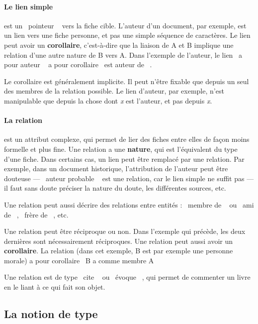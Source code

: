 \documentclass[11pt,french]{article}
\makeatletter
\providecommand{\og}{\leavevmode\flqq~}%
\providecommand{\fg}{\ifdim\lastskip>\z@\unskip\fi~\frqq}%
\makeatother
\begin{document}
\paragraph{Le lien simple }

est un \og pointeur \fg{} vers la fiche cible. L'auteur d'un document,
par exemple, est un lien vers une fiche personne, et pas une simple
séquence de caractères. Le lien peut avoir un \textbf{corollaire},
c'est-à-dire que la liaison de A et B implique une relation d'une
autre nature de B vers A. Dans l'exemple de l'auteur, le lien \og a
pour auteur \fg{} a pour corollaire \og est auteur de \fg{}. 

Le corollaire est généralement implicite. Il peut n'être fixable que
depuis un seul des membres de la relation possible. Le lien d'auteur,
par exemple, n'est manipulable que depuis la chose dont \emph{x} est
l'auteur, et pas depuis \emph{x}. 


\paragraph{La relation}

est un attribut complexe, qui permet de lier des fiches entre elles
de façon moins formelle et plus fine. Une relation a une \textbf{nature},
qui est l'équivalent du type d'une fiche. Dans certains cas, un lien
peut être remplacé par une relation. Par exemple, dans un document
historique, l'attribution de l'auteur peut être douteuse — \og auteur
probable \fg{} est une relation, car le lien simple ne suffit pas
— il faut sans doute préciser la nature du doute, les différentes
sources, etc.

Une relation peut aussi décrire des relations entre entités : \og membre
de \fg{} ou \og ami de \fg{}, \og frère de \fg{}, etc.

Une relation peut être réciproque ou non. Dans l'exemple qui précède,
les deux dernières sont nécessairement réciproques. Une relation peut
aussi avoir un \textbf{corollaire}. La relation 
(dans cet exemple, B est par exemple une personne morale) a pour corollaire
\og B a comme membre A \fg{}

Une relation est de type \og cite \fg{} ou \og évoque \fg{}, qui
permet de commenter un livre en le liant à ce qui fait son objet. 


\subsection{La notion de type\label{sub:Type}}
\end{document}
